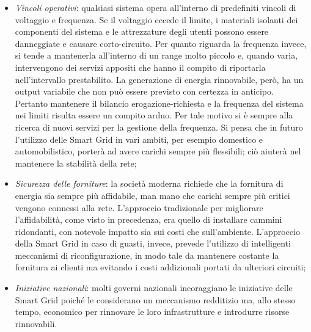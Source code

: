 \begin{itemize}
\item \textit{Vincoli operativi}: qualsiasi sistema opera all'interno di predefiniti vincoli di voltaggio e frequenza. Se il voltaggio eccede il limite, i materiali isolanti dei componenti del sistema e le attrezzature degli utenti possono essere danneggiate e causare corto-circuito. \newline Per quanto riguarda la frequenza invece, si tende a mantenerla all'interno di un range molto piccolo e, quando varia, intervengono dei servizi appositi che hanno il compito di riportarla nell'intervallo prestabilito. \newline
La generazione di energia rinnovabile, però, ha un output variabile che non può essere previsto con certezza in anticipo. Pertanto mantenere il bilancio erogazione-richiesta e la frequenza del sistema nei limiti risulta essere un compito arduo. Per tale motivo si è sempre alla ricerca di nuovi servizi per la gestione della frequenza. \newline Si pensa che in futuro l'utilizzo delle Smart Grid in vari ambiti, per esempio domestico e automobilistico, porterà ad avere carichi sempre più flessibili; ciò aiuterà nel mantenere la stabilità della rete;

\item \textit{Sicurezza delle forniture}: la società moderna richiede che la fornitura di energia sia sempre più affidabile, man mano che carichi sempre più critici vengono connessi alla rete. L'approccio tradizionale per migliorare l'affidabilità, come visto in precedenza, era quello di installare cammini ridondanti, con notevole impatto sia sui costi che sull'ambiente. \newline L'approccio della Smart Grid in caso di guasti, invece, prevede l'utilizzo di intelligenti meccanismi di riconfigurazione, in modo tale da mantenere costante la fornitura ai clienti ma evitando i costi addizionali portati da ulteriori circuiti;
\item \textit{Iniziative nazionali}: molti governi nazionali incoraggiano le iniziative delle Smart Grid poiché le considerano un meccanismo redditizio ma, allo stesso tempo, economico per rinnovare le loro infrastrutture e introdurre risorse rinnovabili.
\end{itemize}
